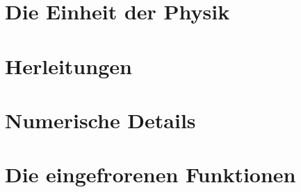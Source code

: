 \documentclass[11pt,a4paper]{book}
\begin{document}


\chapter{Die Einheit der Physik}
\label{ch:einheit}




\appendix

\chapter{Herleitungen}
\label{app:herleitungen}



\chapter{Numerische Details}
\label{app:numerik}



\chapter{Die eingefrorenen Funktionen}
\label{app:frozen}






\end{document}
